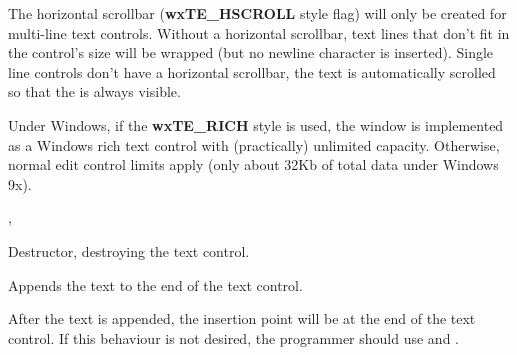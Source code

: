 






The horizontal scrollbar ({\bf wxTE\_HSCROLL} style flag) will only be created for multi-line text controls.
Without a horizontal scrollbar, text lines that don't fit in the control's
size will be wrapped (but no newline character is inserted). Single line
controls don't have a horizontal scrollbar, the text is automatically scrolled
so that the  is always
visible.

Under Windows, if the {\bf wxTE\_RICH} style is used, the window is implemented
as a Windows rich text control with (practically) unlimited capacity.
Otherwise, normal edit control limits apply (only about 32Kb of total data
under Windows 9x).


, 



Destructor, destroying the text control.

\label{wxtextctrlappendtext}


Appends the text to the end of the text control.




After the text is appended, the insertion point will be at the end of the text control. If this behaviour is not desired,
the programmer should use  and .


